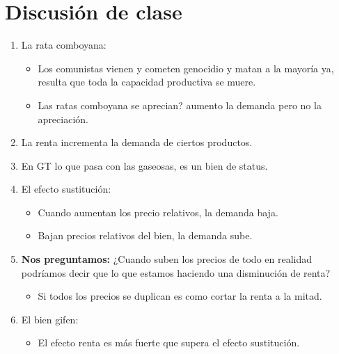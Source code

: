 \section{Discusión de clase}
\begin{enumerate}
    \item La rata comboyana:
        \begin{itemize}
            \item Los comunistas vienen y cometen genocidio y matan a la mayoría ya, resulta que toda la capacidad productiva se muere.
            \item Las ratas comboyana se aprecian? aumento la demanda pero no la apreciación. 
        \end{itemize}
    
    \item La renta incrementa la demanda de ciertos productos.
    \item En GT lo que pasa con las gaseosas, es un bien de status.
    \item El efecto sustitución:
        \begin{itemize}
            \item Cuando aumentan los precio relativos, la demanda baja.
            \item Bajan precios relativos del bien, la demanda sube.
        \end{itemize}
    
    \item \textbf{Nos preguntamos:} ¿Cuando suben los precios de todo en realidad podríamos decir que lo que estamos haciendo una disminución de renta?
        \begin{itemize}
            \item Si todos los precios se duplican es como cortar la renta a la mitad.
        \end{itemize}
    
    \item El bien gifen:
        \begin{itemize}
            \item El efecto renta es más fuerte que supera el efecto sustitución.
        \end{itemize}
    

\end{enumerate}
